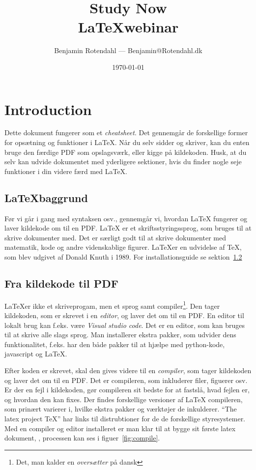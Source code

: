 \documentclass{article}
\title{
  \vspace{13em}
  \large{Study Now} \\
  \Large{\LaTeX webinar} \\
}
\author{
  Benjamin Rotendahl --- Benjamin@Rotendahl.dk
}
\date{
  \vspace{22em}
  \today
}
\begin{document}
\maketitle		%
\thispagestyle{empty}
\newpage

\thispagestyle{empty}
\tableofcontents
\newpage %

\setcounter{page}{1}

\section{Introduction}
 Dette dokument fungerer som et \emph{cheatsheet}. Det gennemgår de forskellige
 former for opsætning og funktioner i \LaTeX. Når du selv sidder og skriver, kan
 du enten bruge den færdige PDF som opslagsværk, eller kigge på kildekoden.
 Husk, at du selv kan udvide dokumentet med yderligere sektioner, hvis du finder
 nogle seje funktioner i din videre færd med \LaTeX{}.

 \subsection{\LaTeX baggrund}
   Før vi går i gang med syntaksen osv., gennemgår vi, hvordan \LaTeX{} fungerer og
   laver kildekode om til en PDF.
   \LaTeX{} er et skriftsstyringssprog, som bruges til at skrive dokumenter med. Det er
   særligt godt til at skrive dokumenter med matematik, kode og andre
   videnskablige figurer. \LaTeX er en udvidelse af TeX, som blev udgivet af Donald
   Knuth i 1989. For installationsguide se sektion~\ref{hejsa}

 \subsection{Fra kildekode til PDF}\label{hejsa}
   \LaTeX er ikke et skriveprogam, men et sprog samt compiler\footnote{
     Det, man kalder en \emph{oversætter} på dansk}. Den tager kildekoden, som
   er skrevet i en \emph{editor}, og laver det om til en PDF. En editor til
   lokalt brug kan f.eks. være \emph{Visual studio code}\cite{vscode}. Det er
   en editor, som kan bruges til at skrive alle slags sprog. Man installerer
   ekstra pakker, som udvider dens funktionalitet, f.eks. har den både pakker
   til at hjælpe med python-kode, javascript og \LaTeX{}\cite{latexPackage}.

   Efter koden er skrevet, skal den gives videre til en \emph{compiler}, som
   tager kildekoden og laver det om til en PDF. Det er compileren, som
   inkluderer filer, figuerer osv. Er der en fejl i kildekoden, gør compileren
   sit bedste for at fastslå, hvad fejlen er, og hvordan den kan fixes. Der findes
   forskellige versioner af LaTeX compileren, som prinært varierer i, hvilke
   ekstra pakker og værktøjer de inkulderer.
   ``The latex project TeX''\cite{texLive} har links til distrubtioner for de
   de forskellige styresystemer. Med en compiler og editor installeret er man
   klar til at bygge sit første latex dokument, , processen kan ses i
   figuer~\ref{fig:compile}.
\end{document}
